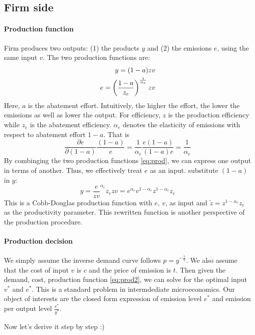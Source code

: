\documentclass[12pt]{article}[margin=1in]
\begin{document}
\subsection{Firm side}
\paragraph{Production function} Firm produces two outputs: (1) the products $y$ and (2) the emissions $e$, using the same input $v$. The two production functions are:
\begin{align}\label{eq:prod}
    y= (1-a)zv \\
    e = \left(\frac{1-a}{z_e}\right)^{\frac{1}{\alpha_e}} zv
\end{align}
Here, $a$ is the abatement effort. Intuitively, the higher the effort, the lower the emissions as well as lower the output. For efficiency, $z$ is the production efficiency while $z_e$ is the abatement efficiency. $\alpha_e$ denotes the elasticity of emissions with respect to abatement effort $1-a$. That is
$$ \frac{\partial e}{\partial (1-a)}\frac{(1-a)}{e} = \frac{1}{\alpha_e}\frac{e(1-a)}{(1-a)e}= \frac{1}{\alpha_e}$$
By combinging the two production functions \ref{eq:prod}, we can express one output in terms of another. Thus, we effectively treat $e$ as an input.
substitute $(1-a)$ in $y$:
\begin{equation}\label{eq:prod2}
    y = \frac{e}{zv}^{\alpha_e}z_e zv = e^{\alpha_e}v^{1-\alpha_e}z^{1-\alpha_e}z_e
\end{equation}
This is a Cobb-Douglas production function with $e$, $v$, as input and $\tilde{z} = z^{1-\alpha_e}z_e$ as the productivity parameter.
This rewritten function is another perspective of the production procedure.
\paragraph{Production decision} We simply assume the inverse demand curve follows $p=y^{-\frac{1}{\eta}}$. We also assume that the cost of input $v$ is $c$ and the price of emission is $t$. Then given the demand, cost, production function \ref{eq:prod2}, we can solve for the optimal input $v^*$ and $e^*$. This is a standard problem in intermdediate microeconomics.
Our object of interests are the closed form expression of emission level $e^*$ and emission per output level $\frac{e^*}{y^*}$.

Now let's derive it step by step :)
\end{document}
